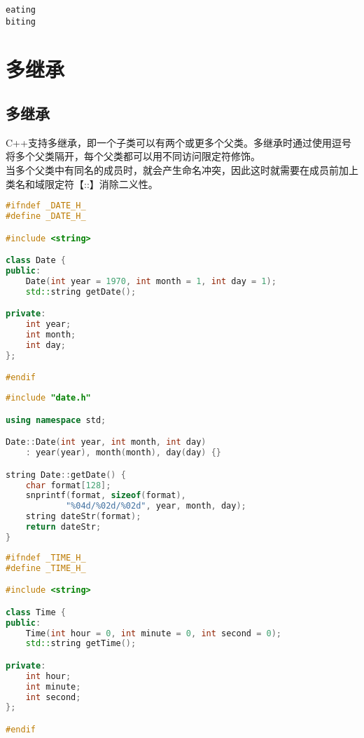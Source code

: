 \begin{tcolorbox}
	\begin{verbatim}
eating
biting
	\end{verbatim}
\end{tcolorbox}

\newpage

\section{多继承}

\subsection{多继承}

C++支持多继承，即一个子类可以有两个或更多个父类。多继承时通过使用逗号将多个父类隔开，每个父类都可以用不同访问限定符修饰。 \\

当多个父类中有同名的成员时，就会产生命名冲突，因此这时就需要在成员前加上类名和域限定符【::】消除二义性。 \\


\begin{lstlisting}[language=C++, title=date.h]
#ifndef _DATE_H_
#define _DATE_H_

#include <string>

class Date {
public:
    Date(int year = 1970, int month = 1, int day = 1);
    std::string getDate();

private:
    int year;
    int month;
    int day;
};

#endif
\end{lstlisting}

\begin{lstlisting}[language=C++, title=date.cpp]
#include "date.h"

using namespace std;

Date::Date(int year, int month, int day)
    : year(year), month(month), day(day) {}

string Date::getDate() {
    char format[128];
    snprintf(format, sizeof(format), 
            "%04d/%02d/%02d", year, month, day);
    string dateStr(format);
    return dateStr;
}
\end{lstlisting}

\begin{lstlisting}[language=C++, title=time.h]
#ifndef _TIME_H_
#define _TIME_H_

#include <string>

class Time {
public:
    Time(int hour = 0, int minute = 0, int second = 0);
    std::string getTime();

private:
    int hour;
    int minute;
    int second;
};

#endif
\end{lstlisting}

